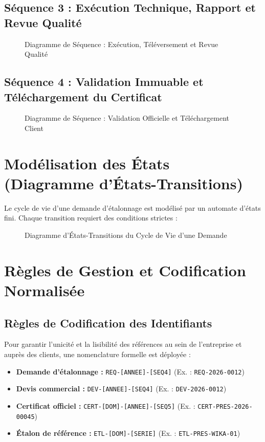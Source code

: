 \documentclass{bts-report}
\begin{document}
\subsection{S\'equence 3 : Ex\'ecution Technique, Rapport et Revue Qualit\'e}
\begin{figure}[H]
  \centering
  
  \caption{Diagramme de S\'equence : Ex\'ecution, T\'el\'eversement et Revue Qualit\'e}
  \label{fig:seq-calibration}
\end{figure}

\subsection{S\'equence 4 : Validation Immuable et T\'el\'echargement du Certificat}
\begin{figure}[H]
  \centering
  
  \caption{Diagramme de S\'equence : Validation Officielle et T\'el\'echargement Client}
  \label{fig:seq-certificate}
\end{figure}

\section{Mod\'elisation des \'Etats (Diagramme d'\'Etats-Transitions)}
Le cycle de vie d'une demande d'\'etalonnage est mod\'elis\'e par un automate d'\'etats fini. Chaque transition requiert des conditions strictes :

\begin{figure}[H]
  \centering
  
  \caption{Diagramme d'\'Etats-Transitions du Cycle de Vie d'une Demande}
  \label{fig:state-request}
\end{figure}

\section{R\`egles de Gestion et Codification Normalis\'ee}
\subsection{R\`egles de Codification des Identifiants}
Pour garantir l'unicit\'e et la lisibilit\'e des r\'ef\'erences au sein de l'entreprise et aupr\`es des clients, une nomenclature formelle est d\'eploy\'ee :
\begin{itemize}
  \item \textbf{Demande d'\'etalonnage :} \texttt{REQ-[ANNEE]-[SEQ4]} (Ex. : \texttt{REQ-2026-0012})
  \item \textbf{Devis commercial :} \texttt{DEV-[ANNEE]-[SEQ4]} (Ex. : \texttt{DEV-2026-0012})
  \item \textbf{Certificat officiel :} \texttt{CERT-[DOM]-[ANNEE]-[SEQ5]} (Ex. : \texttt{CERT-PRES-2026-00045})
  \item \textbf{\'Etalon de r\'ef\'erence :} \texttt{ETL-[DOM]-[SERIE]} (Ex. : \texttt{ETL-PRES-WIKA-01})
\end{itemize}
\end{document}
